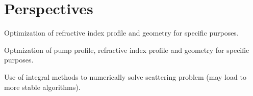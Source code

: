 
\section{Perspectives}

Optimization of refractive index profile and geometry
for specific purposes. 

Optmization of pump profile, refractive index profile
and geometry for specific purposes. 

Use of integral methods to numerically solve scattering
problem (may load to more stable algorithms). 

% 
%   
